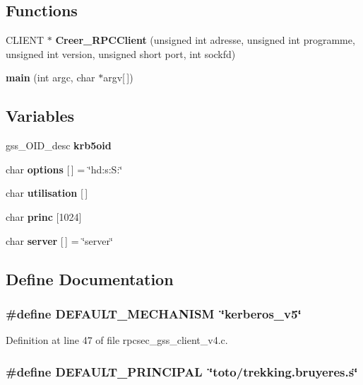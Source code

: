 \subsection*{Functions}
\begin{CompactItemize}
\item 
CLIENT $\ast$ {\bf Creer\_\-RPCClient} (unsigned int adresse, unsigned int programme, unsigned int version, unsigned short port, int sockfd)
\item 
{\bf main} (int argc, char $\ast$argv[$\,$])
\end{CompactItemize}
\subsection*{Variables}
\begin{CompactItemize}
\item 
gss\_\-OID\_\-desc {\bf krb5oid}
\item 
char {\bf options} [$\,$] = \char`\"{}hd:s:S:\char`\"{}
\item 
char {\bf utilisation} [$\,$]
\item 
char {\bf princ} [1024]
\item 
char {\bf server} [$\,$] = \char`\"{}server\char`\"{}
\end{CompactItemize}


\subsection{Define Documentation}
\subsubsection{\setlength{\rightskip}{0pt plus 5cm}\#define DEFAULT\_\-MECHANISM\ \char`\"{}kerberos\_\-v5\char`\"{}}\label{rpcsec__gss__client__v4_8c_a8}




Definition at line 47 of file rpcsec\_\-gss\_\-client\_\-v4.c.
\subsubsection{\setlength{\rightskip}{0pt plus 5cm}\#define DEFAULT\_\-PRINCIPAL\ \char`\"{}toto/trekking.bruyeres.s\char`\"{}}\label{rpcsec__gss__client__v4_8c_a9}




